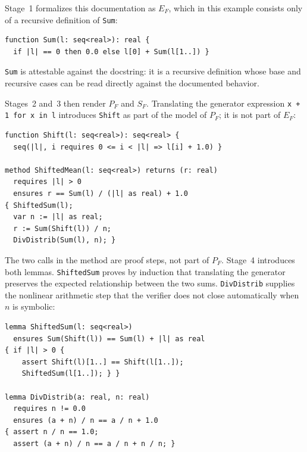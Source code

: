 \noindent
Stage~1 formalizes this documentation as $E_F$, which in this example consists
only of a recursive definition of \texttt{Sum}:

\begin{center}
\begin{minipage}{0.86\linewidth}
\begin{lstlisting}[language=Dafny,basicstyle=\ttfamily\footnotesize,columns=fullflexible,keepspaces=true]
function Sum(l: seq<real>): real {
  if |l| == 0 then 0.0 else l[0] + Sum(l[1..]) }
\end{lstlisting}
\end{minipage}
\end{center}

\noindent
\texttt{Sum} is attestable against the docstring: it is a recursive definition
whose base and recursive cases can be read directly against the documented
behavior.

Stages~2 and~3 then render $P_F$ and $S_F$. Translating the generator expression
\texttt{x + 1 for x in l} introduces \texttt{Shift} as part of the model of
$P_F$; it is not part of $E_F$:

\begin{center}
\begin{minipage}{0.86\linewidth}
\begin{lstlisting}[language=Dafny,basicstyle=\ttfamily\footnotesize,columns=fullflexible,keepspaces=true]
function Shift(l: seq<real>): seq<real> {
  seq(|l|, i requires 0 <= i < |l| => l[i] + 1.0) }

method ShiftedMean(l: seq<real>) returns (r: real)
  requires |l| > 0
  ensures r == Sum(l) / (|l| as real) + 1.0
{ ShiftedSum(l);
  var n := |l| as real;
  r := Sum(Shift(l)) / n;
  DivDistrib(Sum(l), n); }
\end{lstlisting}
\end{minipage}
\end{center}

\noindent
The two calls in the method are proof steps, not part of $P_F$. Stage~4
introduces both lemmas. \texttt{ShiftedSum} proves by induction that translating
the generator preserves the expected relationship between the two sums.
\texttt{DivDistrib} supplies the nonlinear arithmetic step that the verifier
does not close automatically when $n$ is symbolic:

\begin{center}
\begin{minipage}{0.86\linewidth}
\begin{lstlisting}[language=Dafny,basicstyle=\ttfamily\footnotesize,columns=fullflexible,keepspaces=true]
lemma ShiftedSum(l: seq<real>)
  ensures Sum(Shift(l)) == Sum(l) + |l| as real
{ if |l| > 0 {
    assert Shift(l)[1..] == Shift(l[1..]);
    ShiftedSum(l[1..]); } }

lemma DivDistrib(a: real, n: real)
  requires n != 0.0
  ensures (a + n) / n == a / n + 1.0
{ assert n / n == 1.0;
  assert (a + n) / n == a / n + n / n; }
\end{lstlisting}
\end{minipage}
\end{center}

